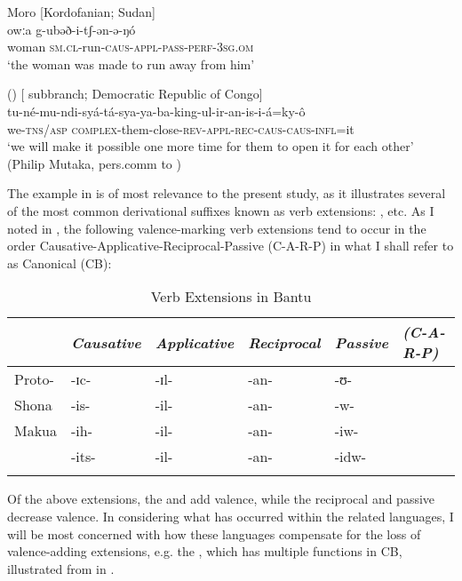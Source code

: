 \documentclass[output=paper]{langsci/langscibook}
\begin{document}
  \ex \label{ex:hyman:1c}
  Moro [Kordofanian; Sudan]\\ 
    \gll owːa          g-ubəð-i-tʃ-ən-ə-ŋó \\
     woman   \textsc{sm.cl}-run-\textsc{caus-appl}-\textsc{pass}-\textsc{perf}-\textsc{3sg}.\textsc{om}\\
     \glt ‘the woman was made to run away from him’ \citep[49]{Rose2013}
  
  \ex \label{ex:hyman:1d}
   () [ subbranch; Democratic Republic of Congo]\\
    \gll tu-né-mu-ndi-syá-tá-sya-ya-ba-king-ul-ir-an-is-i-á=ky-ô\\
    we-\textsc{tns/asp complex}-them-close-\textsc{rev-appl-rec-caus-caus-infl}=it\\
\glt ‘we will make it possible one more time for them to open it for each other’\\
(Philip Mutaka, pers.comm to \citealt[9]{Nurse2003})
\z 
\z 

The example in  is of most relevance to the present study, as it illustrates several of the most common  derivational suffixes known as verb extensions: ,  etc. As I noted in \citet{Hyman2003}, the following valence-marking verb extensions tend to occur in the order Cau\-sa\-tive-Ap\-pli\-ca\-tive-Reci\-proc\-al-Pas\-sive (C-A-R-P) in what I shall refer to as Canonical  (CB):\\


\begin{table}
\caption{Verb Extensions in Bantu}
\label{tab:hyman:ex2} 
\begin{tabularx}{\textwidth}{Qlllll}
\lsptoprule
& \textit{Causative} & \textit{Applicative} & \textit{Reciprocal} & \textit{Passive} & \textit{(C-A-R-P)}  \\
\midrule
Proto- & -ɪc- & -ɪl- & -an- & -ʊ- &   \\
Shona & -is- & -il- & -an- & -w- &   \\
Makua & -ih- & -il- & -an- & -iw- &   \\
 & -its- & -il- & -an- & -idw- &  \\
\lspbottomrule
\end{tabularx}
\end{table}

\noindent
Of the above extensions, the  and  add valence, while the reciprocal and passive decrease valence. In considering what has occurred within the related  languages, I will be most concerned with how these languages compensate for the loss of valence-adding extensions, e.g. the , which has multiple functions in CB, illustrated from  in .
\end{document}
